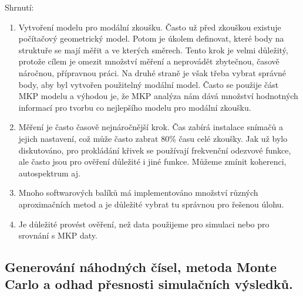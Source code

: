Shrnutí:
\begin{enumerate}
\item Vytvoření modelu pro modální zkoušku. Často už před zkouškou existuje počítačový geometrický model. Potom je úkolem definovat, které body na struktuře se mají měřit a ve kterých směrech. Tento krok je velmi důležitý, protože cílem je omezit množství měření a neprovádět zbytečnou, časově náročnou, přípravnou práci. Na druhé straně je však třeba vybrat správné body, aby byl vytvořen použitelný modální model. Často se použije část MKP modelu a výhodou je, že MKP analýza nám dává množství hodnotných informací pro tvorbu co nejlepšího modelu pro modální zkoušku.
\item Měření je často časově nejnáročnější krok. Čas zabírá instalace snímačů a jejich nastavení, což může často zabrat 80\% času celé zkoušky. Jak už bylo diskutováno, pro
prokládání křivek se používají frekvenční odezvové funkce, ale často jsou pro ověření důležité i jiné funkce. Můžeme zmínit koherenci, autospektrum aj.
\item Mnoho softwarových balíků má implementováno množství různých aproximačních metod a je důležité vybrat tu správnou pro řešenou úlohu.
\item Je důležité provést ověření, než data použijeme pro simulaci nebo pro srovnání s MKP daty.
\end{enumerate}

\subsection{Generování náhodných čísel, metoda Monte Carlo a odhad přesnosti simulačních výsledků.}
